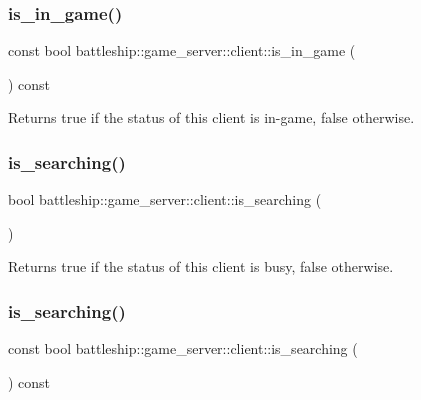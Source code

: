 \subsubsection{\texorpdfstring{is\+\_\+in\+\_\+game()}{is\_in\_game()}\hspace{0.1cm}{\footnotesize\ttfamily [2/2]}}
{\footnotesize\ttfamily const bool battleship\+::game\+\_\+server\+::client\+::is\+\_\+in\+\_\+game (\begin{DoxyParamCaption}{ }\end{DoxyParamCaption}) const\hspace{0.3cm}{\ttfamily [inline]}}

\begin{DoxyReturn}{Returns}
true if the status of this client is in-\/game, false otherwise. 
\end{DoxyReturn}
\mbox{\label{classbattleship_1_1game__server_1_1client_a0a95758fec7cd830ca19278a2b619e92}} 
\subsubsection{\texorpdfstring{is\+\_\+searching()}{is\_searching()}\hspace{0.1cm}{\footnotesize\ttfamily [1/2]}}
{\footnotesize\ttfamily bool battleship\+::game\+\_\+server\+::client\+::is\+\_\+searching (\begin{DoxyParamCaption}{ }\end{DoxyParamCaption})\hspace{0.3cm}{\ttfamily [inline]}}

\begin{DoxyReturn}{Returns}
true if the status of this client is busy, false otherwise. 
\end{DoxyReturn}
\mbox{\label{classbattleship_1_1game__server_1_1client_a6438e71d667d166f663d8d7e67ff7d38}} 
\subsubsection{\texorpdfstring{is\+\_\+searching()}{is\_searching()}\hspace{0.1cm}{\footnotesize\ttfamily [2/2]}}
{\footnotesize\ttfamily const bool battleship\+::game\+\_\+server\+::client\+::is\+\_\+searching (\begin{DoxyParamCaption}{ }\end{DoxyParamCaption}) const\hspace{0.3cm}{\ttfamily [inline]}}

